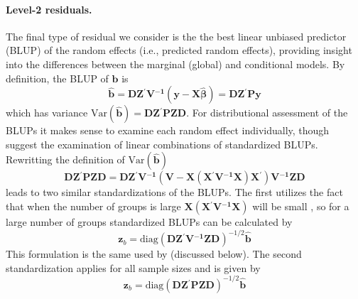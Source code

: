 \documentclass[11pt]{article} %
\newcommand{\inv}{\ensuremath{^{-1}}}
\newcommand{\trans}{\ensuremath{^\prime}}
\newcommand{\var}{\ensuremath{\mathrm{Var}}}
\begin{document}
\paragraph{Level-2 residuals.}
The final type of residual we consider is the the best linear unbiased predictor (BLUP) of the random effects (i.e., predicted random effects), providing insight into the differences between the marginal (global) and conditional models. By definition, the BLUP of $\bm{b}$ is
%
\begin{equation}\label{eq:lev2resid}
\widehat{\bm{b}} = \bm{D Z\trans V\inv} \left( \bm{y} - \bm{X \widehat{\beta}} \right) = \bm{D Z\trans P y}
\end{equation}
%
which has variance $\var(\widehat{\bm{b}}) = \bm{DZ\trans P ZD}$. 
For distributional assessment of the BLUPs it makes sense to examine each random effect individually, though \cite{Lange:1989uu} suggest the examination of linear combinations of standardized BLUPs. Rewritting the definition of $\var(\widehat{\bm{b}})$
%
\begin{equation}
\bm{DZ\trans P ZD} = \bm{DZ\trans} \bm{V\inv} \left( \bm{V} - \bm{ X} \left( \bm{X\trans V\inv X} \right) \bm{X \trans} \right) \bm{V\inv} \bm{ZD}
\end{equation}
%
leads to two similar standardizations of the BLUPs. The first utilizes the fact that when the number of groups is large $\bm{ X} \left( \bm{X\trans V\inv X} \right)$ will be small \citep{Goldstein:2011}, so for a large number of groups standardized BLUPs can be calculated by
%
\begin{equation}\label{eq:lev2-std1}
\bm{z}_{b} = \text{diag} \left(\bm{DZ\trans V\inv ZD}\right)^{-1/2} \widehat{\bm{b}}
\end{equation}
%
This formulation is the same used by \cite{Lange:1989uu} (discussed below).
The second standardization applies for all sample sizes and is given by
%
\begin{equation}\label{eq:lev2-std2}
\bm{z}_{b} = \text{diag} \left(\bm{DZ\trans P ZD}\right)^{-1/2} \widehat{\bm{b}}
\end{equation}
%
\end{document}
